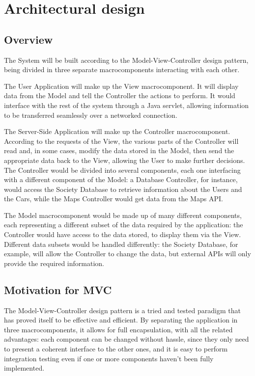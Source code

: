\documentclass[12pt]{article}
\begin{document}
\clearpage
\section{Architectural design}
\subsection{Overview}
The System will be built according to the Model-View-Controller design pattern, being divided in three separate macrocomponents interacting with each other.

The User Application will make up the View macrocomponent. It will display data from the Model and tell the Controller the actions to perform. It would interface with the rest of the system through a Java servlet, allowing information to be transferred seamlessly over a networked connection.

The Server-Side Application will make up the Controller macrocomponent. According to the requests of the View, the various parts of the Controller will read and, in some cases, modify the data stored in the Model, then send the appropriate data back to the View, allowing the User to make further decisions. The Controller would be divided into several components, each one interfacing with a different component of the Model: a Database Controller, for instance, would access the Society Database to retrieve information about the Users and the Cars, while the Maps Controller would get data from the Maps API.

The Model macrocomponent would be made up of many different components, each representing a different subset of the data required by the application: the Controller would have access to the data stored, to display them via the View. Different data subsets would be handled differently: the Society Database, for example, will allow the Controller to change the data, but external APIs will only provide the required information.
\subsection{Motivation for MVC}
The Model-View-Controller design pattern is a tried and tested paradigm that has proved itself to be effective and efficient. By separating the application in three macrocomponents, it allows for full encapsulation, with all the related advantages: each component can be changed without hassle, since they only need to present a coherent interface to the other ones, and it is easy to perform integration testing even if one or more components haven't been fully implemented.
\end{document}
